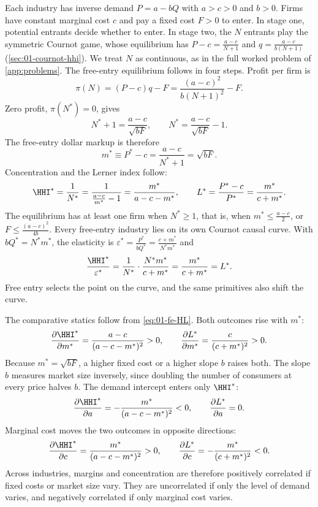 Each industry has inverse demand $P = a - bQ$ with
$a > c > 0$ and $b > 0$. Firms have constant marginal cost $c$ and pay a fixed cost $F > 0$ to enter.
In stage one, potential entrants decide whether to enter.
In stage two, the $N$ entrants play the symmetric Cournot game, whose equilibrium has
$P - c = \frac{a - c}{N + 1}$ and $q = \frac{a - c}{b(N + 1)}$ (\cref{sec:01-cournot-hhi}). We treat $N$
as continuous, as in the full worked problem of \cref{app:problems}. The free-entry equilibrium follows in
four steps. Profit per firm is
\begin{equation}\label{eq:01-fe-profit}
\pi(N) = (P - c) q - F = \frac{(a - c)^2}{b (N + 1)^2} - F.
\end{equation}
Zero profit, $\pi(N^*) = 0$, gives
\begin{equation}\label{eq:01-fe-N}
N^* + 1 = \frac{a - c}{\sqrt{bF}}, \qquad N^* = \frac{a - c}{\sqrt{bF}} - 1.
\end{equation}
The free-entry dollar markup is therefore
\begin{equation}\label{eq:01-fe-markup}
m^* \equiv P^* - c = \frac{a - c}{N^* + 1} = \sqrt{bF}.
\end{equation}
Concentration and the Lerner index follow:
\begin{equation}\label{eq:01-fe-HL}
\HHI^* = \frac{1}{N^*} = \frac{1}{\frac{a - c}{m^*} - 1} = \frac{m^*}{a - c - m^*}, \qquad
L^* = \frac{P^* - c}{P^*} = \frac{m^*}{c + m^*}.
\end{equation}
The equilibrium has at least one firm when $N^* \ge 1$, that is, when $m^* \le \frac{a - c}{2}$, or
$F \le \frac{(a - c)^2}{4b}$. Every free-entry industry lies on its own Cournot causal curve. With
$bQ^* = N^* m^*$, the elasticity is $\varepsilon^* = \frac{P^*}{bQ^*} = \frac{c + m^*}{N^* m^*}$ and
\[
\frac{\HHI^*}{\varepsilon^*} = \frac{1}{N^*} \cdot \frac{N^* m^*}{c + m^*} = \frac{m^*}{c + m^*} = L^*.
\]
Free entry selects the point on the curve, and the same primitives also shift the curve.

The comparative statics follow from \eqref{eq:01-fe-HL}. Both outcomes rise with $m^*$:
\[
\frac{\partial \HHI^*}{\partial m^*} = \frac{a - c}{(a - c - m^*)^2} > 0, \qquad
\frac{\partial L^*}{\partial m^*} = \frac{c}{(c + m^*)^2} > 0 .
\]
Because $m^* = \sqrt{bF}$, a higher fixed cost or a higher slope $b$ raises both. The slope $b$ measures
market size inversely, since doubling the number of consumers at every price halves $b$. The demand
intercept enters only $\HHI^*$:
\[
\frac{\partial \HHI^*}{\partial a} = -\frac{m^*}{(a - c - m^*)^2} < 0, \qquad
\frac{\partial L^*}{\partial a} = 0 .
\]
Marginal cost moves the two outcomes in opposite directions:
\[
\frac{\partial \HHI^*}{\partial c} = \frac{m^*}{(a - c - m^*)^2} > 0, \qquad
\frac{\partial L^*}{\partial c} = -\frac{m^*}{(c + m^*)^2} < 0 .
\]
Across industries, margins and concentration are therefore positively correlated if fixed costs or
market size vary. They are uncorrelated if only the level of demand varies, and negatively correlated if
only marginal cost varies.

